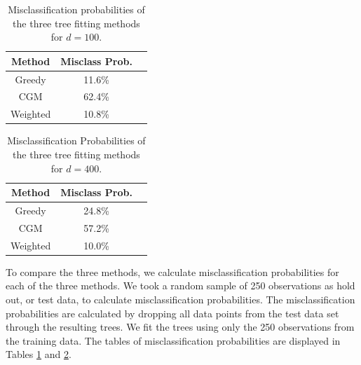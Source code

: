 \begin{table}[h]\footnotesize
\centering
  \begin{tabular}{| c | c | c }
  \hline 
Method & Misclass Prob.\\
      \hline 
Greedy &   11.6\%    \\
 CGM &     62.4\% \\
   Weighted & 10.8\%   \\
      \hline
  \end{tabular}
    \caption[Misclassification probabilities for $d=100$.]{Misclassification probabilities of the three tree fitting methods for $d=100$.}
  \label{tab:sim_misclass1}
\centering
\end{table}

\begin{table}[h]\footnotesize
\centering
  \begin{tabular}{| c | c | c }
  \hline 
Method & Misclass Prob.\\
      \hline 
Greedy &  24.8\%     \\
 CGM &    57.2\% \\
   Weighted &  10.0\%  \\
      \hline
  \end{tabular}
    \caption[Misclassification Probabilities of the three tree fitting methods for $d=400$.]{Misclassification Probabilities of the three tree fitting methods for $d=400$.}
  \label{tab:sim_misclass2}
\centering
\end{table}


To compare the three methods, we calculate misclassification probabilities for each of the three methods. We took a random sample of 250 observations as hold out, or test data, to calculate misclassification probabilities. The misclassification probabilities are calculated by dropping all data points from the test data set through the resulting trees. We fit the trees using only the 250 observations from the training data. The tables of misclassification probabilities are displayed in Tables \ref{tab:sim_misclass1} and \ref{tab:sim_misclass2}.

